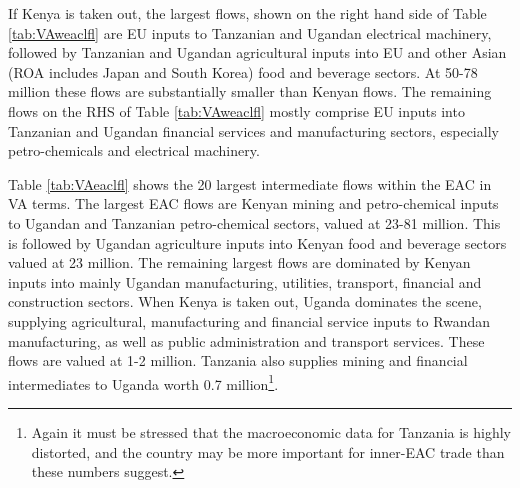 \documentclass[a4paper]{article}
\begin{document}
If Kenya is taken out, the largest flows, shown on the right hand side of Table \ref{tab:VAweaclfl} are EU inputs to Tanzanian and Ugandan electrical machinery, followed by Tanzanian and Ugandan agricultural inputs into EU and other Asian (ROA includes Japan and South Korea) food and beverage sectors. At 50-78 million these flows are substantially smaller than Kenyan flows. The remaining flows on the RHS of Table \ref{tab:VAweaclfl} mostly comprise EU inputs into Tanzanian and Ugandan financial services and manufacturing sectors, especially petro-chemicals and electrical machinery. \newline


Table \ref{tab:VAeaclfl} shows the 20 largest intermediate flows within the EAC in VA terms. %
The largest EAC flows are Kenyan mining and petro-chemical inputs to Ugandan and Tanzanian petro-chemical sectors, valued at 23-81 million. This is followed by Ugandan agriculture inputs into Kenyan food and beverage sectors valued at 23 million. The remaining largest flows are dominated by Kenyan inputs into mainly Ugandan manufacturing, utilities, transport, financial and construction sectors. When Kenya is taken out, Uganda dominates the scene, supplying agricultural, manufacturing and financial service inputs to Rwandan manufacturing, as well as public administration and transport services. These flows are valued at 1-2 million. Tanzania also supplies mining and financial intermediates to Uganda worth 0.7 million\footnote{Again it must be stressed that the macroeconomic data for Tanzania is highly distorted, and the country may be more important for inner-EAC trade than these numbers suggest. }.
\end{document}
